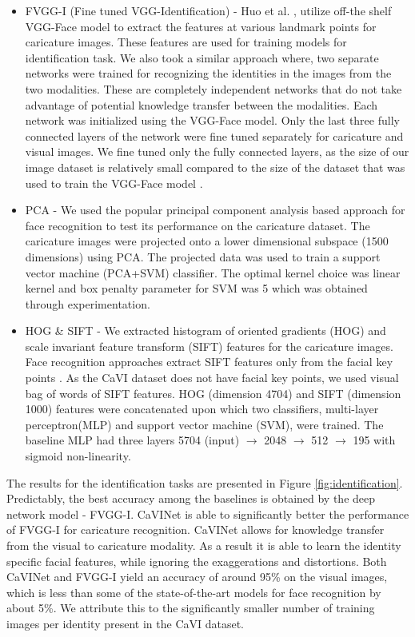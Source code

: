 \begin{itemize}
  \item FVGG-I (Fine tuned VGG-Identification) - Huo et al. \cite{newWebCari_Paper}, utilize off-the shelf VGG-Face model to extract the features at various landmark points for caricature images. These features are used for training models for identification task. We also took a similar approach where, two separate networks were trained for recognizing the identities in the images from the two modalities. These are completely independent networks that do not take advantage of potential knowledge transfer between the modalities. Each network was initialized using the VGG-Face model. Only the last three fully connected layers of the network were fine tuned separately for caricature and visual images. We fine tuned only the fully connected layers, as the size of our image dataset is relatively small compared to the size of the dataset that was used to train the VGG-Face model \cite{Parkhi15}.

  
  \item PCA - We used the popular principal component analysis based approach for face recognition to test its performance on the caricature dataset. The caricature images were projected onto a lower dimensional subspace (1500 dimensions) using PCA. The projected data was used to train a support vector machine (PCA+SVM) classifier. The optimal kernel choice was linear kernel and box penalty parameter for SVM was 5 which was obtained through experimentation.
  
  
  \item HOG \& SIFT - We extracted histogram of oriented gradients (HOG) \cite{hog} and scale invariant feature transform (SIFT) features for the caricature images. Face recognition approaches extract SIFT features only from the facial key points \cite{rw5, face_sift1, face_sift2}. As the CaVI dataset does not have facial key points, we used visual bag of words \cite{visual_bow} of SIFT features. HOG (dimension 4704) and SIFT (dimension 1000) features were concatenated upon which two classifiers, multi-layer perceptron(MLP) and support vector machine (SVM), were trained. The baseline MLP had three layers 5704 (input) $\rightarrow$ 2048 $\rightarrow$ 512 $\rightarrow$ 195 with sigmoid non-linearity.

\end{itemize}
The results for the identification tasks are presented in Figure \ref{fig:identification}. Predictably, the best accuracy among the baselines is obtained by the deep network model - FVGG-I. CaVINet is able to significantly better the performance of FVGG-I for caricature recognition. CaVINet allows for  knowledge transfer from the visual to caricature modality. As a result it is able to learn the identity specific facial features, while ignoring the exaggerations and distortions. Both CaVINet and FVGG-I yield an accuracy of around 95\% on the visual images, which is less than some of the state-of-the-art models  for face recognition by about 5\%. We attribute this to the significantly smaller number of training images per identity present in the CaVI dataset.
